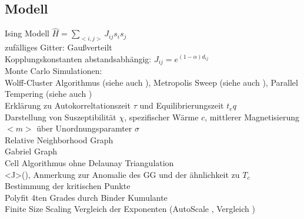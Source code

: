 \subsection{Modell}
    Ising Modell \(\hat{H} = \sum_{<i,j>}J_{ij}s_{i}s_{j}\)\\
    zufälliges Gitter: Gaußverteilt\\
    Kopplungskonstanten abstandsabhängig: \(J_{ij}=e^{(1-\alpha)d_{ij}}\)\\
    Monte Carlo Simulationen:\\
        Wolff-Cluster Algorithmus \cite{Wolff1989} (siehe auch \cite[S. xx]{NewmanBarkema1999}),
        Metropolis Sweep \cite{Metropolis1953} (siehe auch \cite[S. xx]{NewmanBarkema1999}),
        Parallel Tempering \cite{ParallelTempering1986} (siehe auch \cite[S. xx]{NewmanBarkema1999} \cite[S. xx]{Katzgraber2011})\\
        Erklärung zu Autokorreltationszeit \(\tau\) und Equilibrierungszeit \(t_eq\)\\
        Darstellung von Suszeptibilität \(\chi\), spezifischer Wärme \(c\), mittlerer Magnetisierung \(<m>\) über Unordnungsparamter \(\sigma\)\\
    Relative Neighborhood Graph \cite{Toussaint1980}\\
    Gabriel Graph \cite{Gabriel1969}\\
        Cell Algorithmus ohne Delaunay Triangulation \cite{RNGCell}\\
        <J>(\sigma), Anmerkung zur Anomalie des GG und der ähnlichkeit zu \(T_c\)\\
    Bestimmung der kritischen Punkte\\
        Polyfit 4ten Grades durch Binder Kumulante \cite{Binder1981}\\
        Finite Size Scaling Vergleich der Exponenten (AutoScale \cite{Melchert2009}, Vergleich \cite[S. 59]{Pelissetto2002})\\
